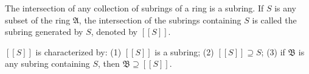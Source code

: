 The intersection of any collection of subrings of a ring is a subring. If $S$ is any subset of the ring $\mathfrak{A}$, the intersection of the subrings containing $S$ is called the subring generated by $S$, denoted by $[[S]]$.

$[[S]]$ is characterized by:
(1) $[[S]]$ is a subring;
(2) $[[S]] \supseteq S$;
(3) if $\mathfrak{B}$ is any subring containing $S$, then $\mathfrak{B} \supseteq [[S]]$.
